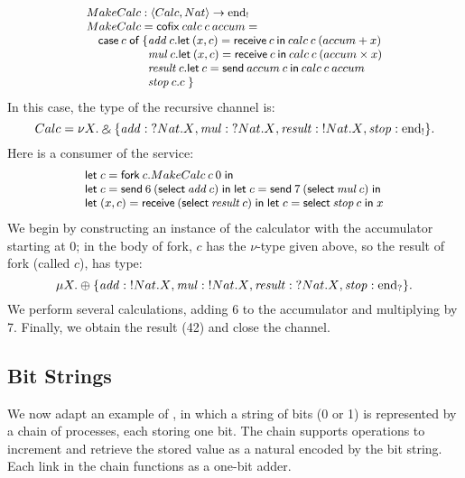 \documentclass[orivec,envcountsame]{llncs}
\makeatletter
\newcommand{\with}{\mathbin\binampersand}
\newcommand{\gvout}[2]{{!#1.#2}}
\newcommand{\gvin}[2]{{?#1.#2}}
\newcommand{\uto}{\ensuremath{\rightarrow}}
\newcommand{\outterm}{\mathrm{end}_!}
\newcommand{\interm}{\mathrm{end}_?}
\newcommand{\mkwd}[1]{\mathsf{#1}}
\newcommand{\tkwd}[1]{\textsf{#1}}
\newcommand{\clabel}[1]{\mathit{#1}}
\newcommand{\gvsend}[2]{\mkwd{send}\:#1\:#2}
\newcommand{\gvreceive}[1]{\mkwd{receive}\:#1}
\newcommand{\gvlet}[3]{\mkwd{let}\;#1 = #2\;\mkwd{in}\;#3}
\newcommand{\gvselect}[2]{\mkwd{select}\:#1\:#2}
\newcommand{\gvfork}[2]{\mkwd{fork}\:#1.#2}
\newcommand{\lrkwd}{\mkwd{cofix}}
\newcommand{\ba}{\begin{array}}
\newcommand{\ea}{\end{array}}
\newcommand{\bl}{\ba[t]{@{}l@{}}}
\newcommand{\el}{\ea}
\newcommand{\todo}[1]{{\noindent\small\color{red} \framebox{\parbox{\dimexpr\linewidth-2\fboxsep-2\fboxrule}{\textbf{TODO:} #1}}}}
\makeatother
\begin{document}
\[\small
\bl
MakeCalc : \langle Calc, Nat \rangle \uto \outterm \\
MakeCalc = \lrkwd\:calc\:c\:accum = \\
\quad
  \bl
  \mkwd{case}\:c\;\mkwd{of}\:\{
    \bl
    \clabel{add}\:c.
      \bl
      \mkwd{let}\:(x,c) = \gvreceive{c} \: \mkwd{in}\:
      calc\:c\:(accum + x) \\
      \el \\
    \clabel{mul}\:c.
      \bl
      \mkwd{let}\:(x,c) = \gvreceive{c}\:\mkwd{in}\:
      calc\:c\:(accum \times x) \\
      \el \\
    \clabel{result}\:c.
      \bl
      \mkwd{let}\:c = \gvsend{accum}{c}\:\mkwd{in}\:
      calc\:c\:accum \\
      \el \\
    \clabel{stop}\:c.c \; \}
    \el \\
  \el \\
\el
\]
In this case, the type of the recursive channel is:
\[\small
 Calc = \nu X. \with \{ \clabel{add}: \gvin{Nat}{X},
                        \clabel{mul}: \gvin{Nat}{X},
                        \clabel{result}: \gvout{Nat}{X},
                        \clabel{stop}: \outterm \}.
\]%
Here is a consumer of the service:
\[\small
\bl
  \gvlet{c}{\gvfork{c}{MakeCalc\:c\:0}}{} \\
  \gvlet{c}{\gvsend{6}{(\gvselect{\clabel{add}}{c})}}{
  \gvlet{c}{\gvsend{7}{(\gvselect{\clabel{mul}}{c})}}{}} \\
  \gvlet{(x,c)}{\gvreceive{(\gvselect{\clabel{result}}{c})}}{
  \gvlet{c}{\gvselect{\clabel{stop}}{c}}{x}}
\el
\]
We begin by constructing an instance of the calculator with the accumulator starting at 0; in the
body of \tkwd{fork}, $c$ has the $\nu$-type given above, so the result of \tkwd{fork} (called
$c$), has type:
\[\small
\mu X. \oplus \{ \clabel{add}: \gvout{Nat}{X}, \clabel{mul}: \gvout{Nat}{X}, \clabel{result}: \gvin{Nat}{X}, \clabel{stop}: \interm \}.
\]
We perform several calculations, adding 6 to the accumulator and multiplying by 7.  Finally, we
obtain the result (42) and close the channel.

\subsection{Bit Strings}
%

We now adapt an example of \citet{Toninho13}, in which a string of bits (0 or 1) is represented by a
chain of processes, each storing one bit. The chain supports operations to increment and retrieve
the stored value as a natural encoded by the bit string. Each link in the chain functions as a
one-bit adder.
\end{document}
